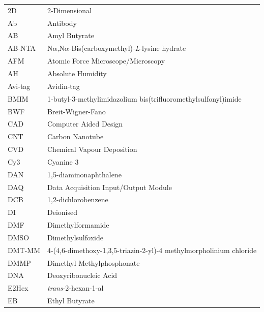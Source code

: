 \documentclass[
  a4paper,
]{scrbook}
\begin{document}
\begin{spacing}{1.2}
\begin{table}[H]
  \begin{tabular}{@{}p{} p{}@{}}  %
    2D  & 2-Dimensional  \\[5pt]
    Ab  & Antibody  \\[5pt]
    AB  & Amyl Butyrate  \\[5pt]
    AB-NTA  & N$\alpha$,N$\alpha$-Bis(carboxymethyl)-\textit{L}-lysine hydrate  \\[5pt]
    AFM  & Atomic Force Microscope/Microscopy  \\[5pt]
    AH  & Absolute Humidity  \\[5pt]
    Avi-tag  & Avidin-tag  \\[5pt]
    BMIM  & 1-butyl-3-methylimidazolium bis(trifluoromethylsulfonyl)imide  \\[5pt]
    BWF  & Breit-Wigner-Fano  \\[5pt]
    CAD  & Computer Aided Design \\[5pt]
    CNT  & Carbon Nanotube  \\[5pt]
    CVD  & Chemical Vapour Deposition  \\[5pt]
    Cy3  & Cyanine 3  \\[5pt]
    DAN  & 1,5-diaminonaphthalene  \\[5pt]
    DAQ  & Data Acquisition Input/Output Module  \\[5pt]
    DCB  & 1,2-dichlorobenzene  \\[5pt]
    DI  & Deionised  \\[5pt]
    DMF  & Dimethylformamide   \\[5pt]
    DMSO  & Dimethylsulfoxide   \\[5pt]
    DMT-MM   & 4-(4,6-dimethoxy-1,3,5-triazin-2-yl)-4 methylmorpholinium chloride \\[5pt]
    DMMP  & Dimethyl Methylphosphonate  \\[5pt]
    DNA  & Deoxyribonucleic Acid  \\[5pt]
    E2Hex  & \textit{trans}-2-hexan-1-al  \\[5pt]
    EB  & Ethyl Butyrate  \\[5pt]
  \end{tabular}
\end{table}


\end{spacing}
\end{document}
